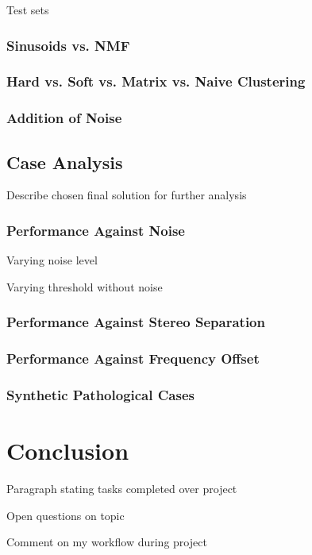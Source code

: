 \documentclass[10pt,twoside,a4paper]{report}
\begin{document}
Test sets

\subsection{Sinusoids vs. NMF}

\subsection{Hard vs. Soft vs. Matrix vs. Naive Clustering}

\subsection{Addition of Noise}

\section{Case Analysis}

Describe chosen final solution for further analysis

\subsection{Performance Against Noise}

Varying noise level

Varying threshold without noise

\subsection{Performance Against Stereo Separation}

\subsection{Performance Against Frequency Offset}

\subsection{Synthetic Pathological Cases}

\chapter{Conclusion}

Paragraph stating tasks completed over project

Open questions on topic

Comment on my workflow during project
\end{document}
